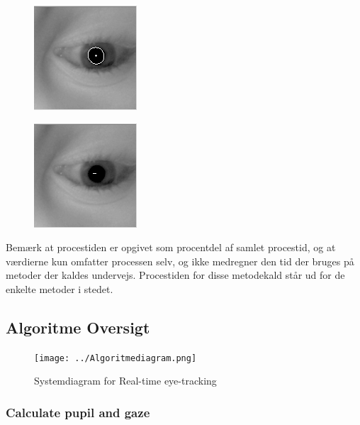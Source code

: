 \documentclass[rapport.tex]{subfiles}
\begin{document}
		
		
	\begin{figure}
	\centering
	\includegraphics[width=0.4\linewidth]{Billeder/Starburst, Ellipse.png}
	\caption{}
	\label{fig:Starburst,Ellipse}
	\end{figure}
	
	
	\begin{figure}
	\centering
	\includegraphics[width=0.4\linewidth]{Billeder/Starburst, Gaze.png}
	\caption{}
	\label{fig:Starburst,Gaze}
	\end{figure}
	
	
	Bemærk at procestiden er opgivet som procentdel af samlet procestid, og at værdierne kun omfatter processen selv, og ikke medregner den tid der bruges på metoder der kaldes undervejs. Procestiden for disse metodekald står ud for de enkelte metoder i stedet.
	
	\subsection{Algoritme Oversigt}
	\begin{figure}[h]
		\centering
		\texttt{[image: ../Algoritmediagram.png]}
		\caption[Systemdiagram]{Systemdiagram for Real-time eye-tracking}
		\label{fig:Systemdiagram}
	\end{figure}
	
	\subsubsection{Calculate pupil and gaze}
	
\end{document}
